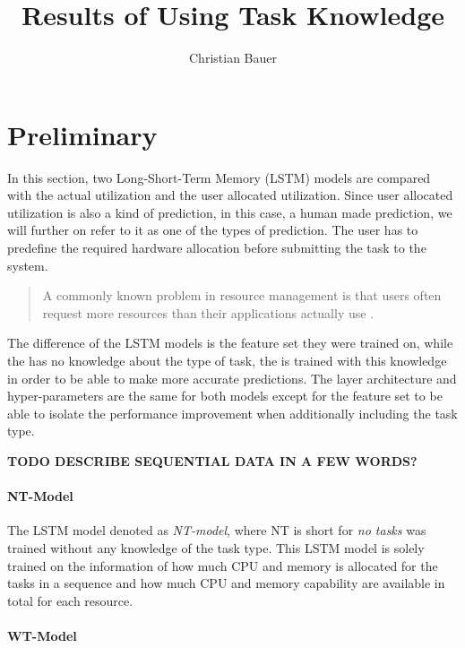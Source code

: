 \documentclass{article}
\title{Results of Using Task Knowledge}
\author{Christian Bauer}
\begin{document}
  \maketitle

  \section{Preliminary}
  
    In this section, two Long-Short-Term Memory \cite{hochreiterLongShortTermMemory1997} (LSTM) models 
    are compared with the actual utilization and the user allocated utilization.
    Since user allocated utilization is also a kind of prediction, in this case, a human made prediction, we will further on refer to it as one of the types of prediction.  The user has to predefine the required hardware allocation before submitting the task to the system.
    \begin{quote}
      A commonly known problem in resource management is that users often request more resources than their applications actually use \cite{thonglekImprovingResourceUtilization2019}.
    \end{quote}
    The difference of the LSTM models is the feature set they were trained on, while the  has no knowledge about the type of task,
    the  is trained with this knowledge in order to be able to make more accurate predictions.
    The layer architecture and hyper-parameters are the same for both models except for the feature set to be able to isolate the performance improvement when additionally including the task type.

    \textbf{TODO DESCRIBE SEQUENTIAL DATA IN A FEW WORDS?}
    
  
  \paragraph*{NT-Model}
  \label{par:nt-model}

    The LSTM model denoted as \emph{NT-model}, 
    where NT is short for \emph{no tasks} was trained without any knowledge of the task type.
    This LSTM model is solely trained on the information of how much CPU and memory is allocated for the tasks in a sequence and how much CPU and memory capability are available in total for each resource.
  
  \paragraph*{WT-Model}
  \label{par:wt-model}
\end{document}
